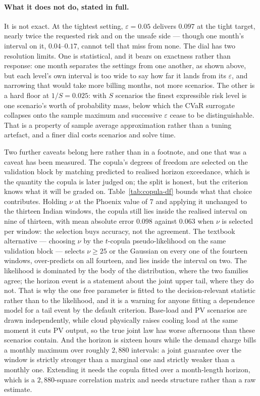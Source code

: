 \paragraph{What it does not do, stated in full.} It is not exact. At the
tightest setting, $\varepsilon=0.05$ delivers $0.097$ at the tight target,
nearly twice the requested risk and on the unsafe side --- though one month's
interval on it, $0.04$--$0.17$, cannot tell that miss from none. The dial has
two resolution limits. One is statistical, and it bears on exactness rather
than response: one month separates the settings from one another, as shown
above, but each level's own interval is too wide to say how far it lands from
its $\varepsilon$, and narrowing that would take more billing months, not more
scenarios. The other is a hard floor
at $1/S = 0.025$: with $S$ scenarios the finest expressible
risk level is one scenario's worth of probability mass, below which the CVaR
surrogate collapses onto the sample maximum and successive $\varepsilon$ cease
to be distinguishable. That is a property of sample average approximation rather
than a tuning artefact, and a finer dial costs scenarios and solve time.



Two further caveats belong here rather than in a footnote, and one that was a
caveat has been measured. The copula's degrees of freedom are selected on the
validation block by matching predicted to realised horizon exceedance, which is
the quantity the copula is later judged on; the split is honest, but the
criterion knows what it will be graded on. Table~\ref{tab:copula-df} bounds what
that choice contributes. Holding $\nu$ at the Phoenix value of $7$ and applying
it unchanged to the thirteen Indian windows, the copula still lies inside the
realised interval on nine of thirteen, with mean absolute error $0.098$ against
$0.063$ when $\nu$ is selected per window: the selection buys accuracy, not the
agreement. The textbook alternative --- choosing $\nu$ by the $t$-copula
pseudo-likelihood on the same validation block --- selects $\nu \geq 25$ or the
Gaussian on every one of the fourteen windows, over-predicts on all fourteen,
and lies inside the interval on two. The likelihood is dominated by the body of
the distribution, where the two families agree; the horizon event is a statement
about the joint upper tail, where they do not. That is why the one free
parameter is fitted to the decision-relevant statistic rather than to the
likelihood, and it is a warning for anyone fitting a dependence model for a
tail event by the default criterion. Base-load and PV scenarios are drawn
independently, while cloud physically raises cooling load at the same moment it
cuts PV output, so the true joint law has worse afternoons than these scenarios
contain. And the horizon is sixteen hours while the demand charge bills a
monthly maximum over roughly $2{,}880$ intervals: a joint guarantee over the
window is strictly stronger than a marginal one and strictly weaker than a
monthly one. Extending it needs the copula fitted over a month-length horizon,
which is a $2{,}880$-square correlation matrix and needs structure rather than a
raw estimate.

